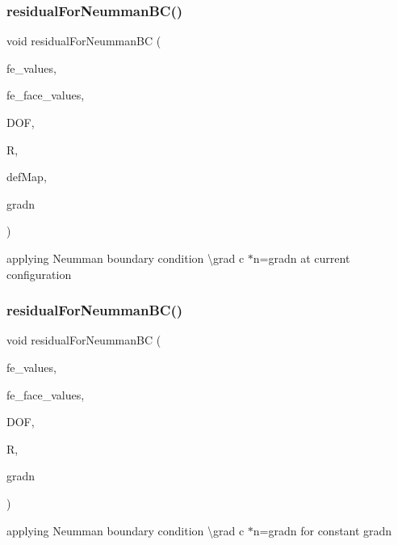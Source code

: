 \subsubsection{\texorpdfstring{residualForNeummanBC()}{residualForNeummanBC()}\hspace{0.1cm}{\footnotesize\ttfamily [3/4]}}
{\footnotesize\ttfamily void residual\+For\+Neumman\+BC (\begin{DoxyParamCaption}\item[{const F\+E\+Values$<$ dim $>$ \&}]{fe\+\_\+values,  }\item[{const F\+E\+Face\+Values$<$ dim $>$ \&}]{fe\+\_\+face\+\_\+values,  }\item[{unsigned int}]{D\+OF,  }\item[{dealii\+::\+Table$<$ 1, T $>$ \&}]{R,  }\item[{\mbox{\hyperlink{structdeformation_map}{deformation\+Map}}$<$ T, dim $>$ \&}]{def\+Map,  }\item[{dealii\+::\+Table$<$ 1, T $>$ \&}]{gradn }\end{DoxyParamCaption})}

applying Neumman boundary condition \textbackslash{}grad c $\ast$n=gradn at current configuration \mbox{\label{class_residual_a1e66cf9fc807561fc00cffb93c52d37d}} 
\subsubsection{\texorpdfstring{residualForNeummanBC()}{residualForNeummanBC()}\hspace{0.1cm}{\footnotesize\ttfamily [4/4]}}
{\footnotesize\ttfamily void residual\+For\+Neumman\+BC (\begin{DoxyParamCaption}\item[{const F\+E\+Values$<$ dim $>$ \&}]{fe\+\_\+values,  }\item[{const F\+E\+Face\+Values$<$ dim $>$ \&}]{fe\+\_\+face\+\_\+values,  }\item[{unsigned int}]{D\+OF,  }\item[{dealii\+::\+Table$<$ 1, T $>$ \&}]{R,  }\item[{double}]{gradn }\end{DoxyParamCaption})}

applying Neumman boundary condition \textbackslash{}grad c $\ast$n=gradn for constant gradn \mbox{\label{class_residual_af1d58eecf6eeae74de2f7ebc6a158b18}} 
